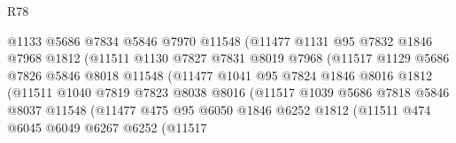 \begin{lexlean}{R78}
\begin{coremodule}
                              @1133
                              @5686
                              @7834
                              @5846
                              @7970
                              @11548
                              (@11477
                                @1131
                                @95
                                @7832
                                @1846
                                @7968
                                @1812
                                (@11511
                                  @1130
                                  @7827
                                  @7831
                                  @8019
                                  @7968
                                  (@11517
                                    @1129
                                    @5686
                                    @7826
                                    @5846
                                    @8018
                                    @11548
                                    (@11477
                                      @1041
                                      @95
                                      @7824
                                      @1846
                                      @8016
                                      @1812
                                      (@11511
                                        @1040
                                        @7819
                                        @7823
                                        @8038
                                        @8016
                                        (@11517
                                          @1039
                                          @5686
                                          @7818
                                          @5846
                                          @8037
                                          @11548
                                          (@11477
                                            @475
                                            @95
                                            @6050
                                            @1846
                                            @6252
                                            @1812
                                            (@11511
                                              @474
                                              @6045
                                              @6049
                                              @6267
                                              @6252
                                              (@11517

\end{coremodule}
\end{lexlean}
